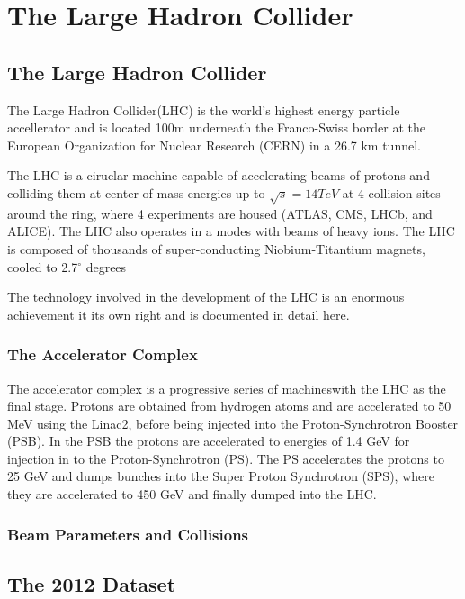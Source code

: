 \chapter[The Large Hadron Collider][The Large Hadron Collider]{The Large Hadron Collider}
\section{The Large Hadron Collider}

The Large Hadron Collider(LHC) is the world's highest energy particle accellerator 
and is located 100m underneath the Franco-Swiss border at the European Organization
for Nuclear Research (CERN) in a 26.7 km tunnel. 

The LHC is a ciruclar 
machine capable of accelerating beams of protons and colliding them at center of mass 
energies up to $\sqrt{s} = 14 TeV$ at 4 collision sites around the ring, where 4 experiments
are housed (ATLAS, CMS, LHCb, and ALICE). The LHC also operates in a modes with beams of 
heavy ions. The LHC is composed of thousands of super-conducting Niobium-Titantium 
magnets, cooled to 2.7$^\circ$ degrees


The technology involved in the development of the LHC is an enormous achievement
it its own right and is documented in detail here. 

\subsection{The Accelerator Complex}

The accelerator complex is a progressive series of machineswith the LHC as the final stage.
Protons are obtained from hydrogen atoms and are accelerated to 50 MeV using the
Linac2, before being injected into the Proton-Synchrotron Booster (PSB). In
the PSB the protons are accelerated to energies of 1.4 GeV for injection
in to the Proton-Synchrotron (PS). The PS accelerates the protons to 25 GeV
and dumps bunches into the Super Proton Synchrotron (SPS), where they 
are accelerated to 450 GeV and finally dumped into the LHC. 

\subsection{Beam Parameters and Collisions} 




\section{The 2012 Dataset} 
